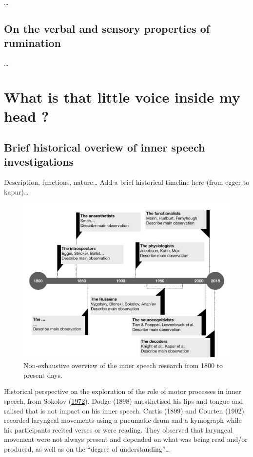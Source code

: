 \documentclass[a4paper,12pt,twoside,openright,oldfontcommands]{memoir}
\begin{document}
\ldots{}

\subsection{On the verbal and sensory properties of
rumination}\label{on-the-verbal-and-sensory-properties-of-rumination}

\ldots{}

\section{What is that little voice inside my head
?}\label{what-is-that-little-voice-inside-my-head}

\subsection{Brief historical overiew of inner speech
investigations}\label{brief-historical-overiew-of-inner-speech-investigations}

Description, functions, nature\ldots{} Add a brief historical timeline
here (from egger to kapur)\ldots{}

\begin{figure}[H]

{\centering \includegraphics[width=1\linewidth]{assets/timeline} 

}

\caption{Non-exhaustive overview of the inner speech research from 1800 to present days.}\label{fig:timeline}
\end{figure}

Historical perspective on the exploration of the role of motor processes
in inner speech, from Sokolov
(\protect\hyperlink{ref-sokolov_inner_1972}{1972}). Dodge (1898)
anesthetised his lips and tongue and ralised that is not impact on his
inner speech. Curtis (1899) and Courten (1902) recorded laryngeal
movements using a pneumatic drum and a kymograph while his participants
recited verses or were reading. They observed that laryngeal movement
were not always present and depended on what was being read and/or
produced, as well as on the ``degree of understanding''\ldots{}
\end{document}
